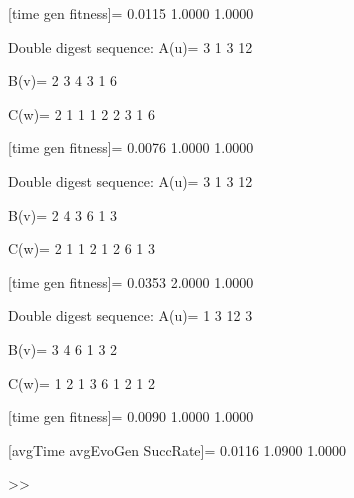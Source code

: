 [time gen fitness]=
    0.0115    1.0000    1.0000

Double digest sequence:
A(u)=
     3     1     3    12

B(v)=
     2     3     4     3     1     6

C(w)=
     2     1     1     1     2     2     3     1     6

[time gen fitness]=
    0.0076    1.0000    1.0000

Double digest sequence:
A(u)=
     3     1     3    12

B(v)=
     2     4     3     6     1     3

C(w)=
     2     1     1     2     1     2     6     1     3

[time gen fitness]=
    0.0353    2.0000    1.0000

Double digest sequence:
A(u)=
     1     3    12     3

B(v)=
     3     4     6     1     3     2

C(w)=
     1     2     1     3     6     1     2     1     2

[time gen fitness]=
    0.0090    1.0000    1.0000

[avgTime  avgEvoGen  SuccRate]=
    0.0116    1.0900    1.0000

>> 